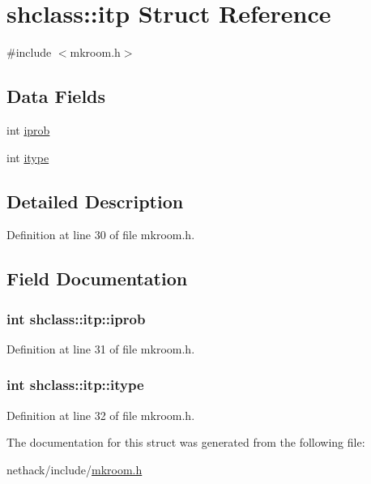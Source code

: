 \hypertarget{structshclass_1_1itp}{\section{shclass\+:\+:itp Struct Reference}
\label{structshclass_1_1itp}
}


{\ttfamily \#include $<$mkroom.\+h$>$}

\subsection*{Data Fields}
\begin{DoxyCompactItemize}
\item 
int \hyperlink{structshclass_1_1itp_adb7016ef0d6f4cd7ad34a2a15e210ef9}{iprob}
\item 
int \hyperlink{structshclass_1_1itp_a74b5ddf79a139f4ec10c7246c13c6c03}{itype}
\end{DoxyCompactItemize}


\subsection{Detailed Description}


Definition at line 30 of file mkroom.\+h.



\subsection{Field Documentation}
\hypertarget{structshclass_1_1itp_adb7016ef0d6f4cd7ad34a2a15e210ef9}{
\subsubsection[{iprob}]{\setlength{\rightskip}{0pt plus 5cm}int shclass\+::itp\+::iprob}}\label{structshclass_1_1itp_adb7016ef0d6f4cd7ad34a2a15e210ef9}


Definition at line 31 of file mkroom.\+h.

\hypertarget{structshclass_1_1itp_a74b5ddf79a139f4ec10c7246c13c6c03}{
\subsubsection[{itype}]{\setlength{\rightskip}{0pt plus 5cm}int shclass\+::itp\+::itype}}\label{structshclass_1_1itp_a74b5ddf79a139f4ec10c7246c13c6c03}


Definition at line 32 of file mkroom.\+h.



The documentation for this struct was generated from the following file\+:\begin{DoxyCompactItemize}
\item 
nethack/include/\hyperlink{mkroom_8h}{mkroom.\+h}\end{DoxyCompactItemize}
